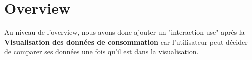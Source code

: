 \section{Overview}

\begin{flushleft}
Au niveau de l'overview, nous avons donc ajouter un "interaction use" après la \textbf{Visualisation des données de consommation} car l'utilisateur peut décider de comparer ses données une fois qu'il est dans la visualisation.
\end{flushleft}

%